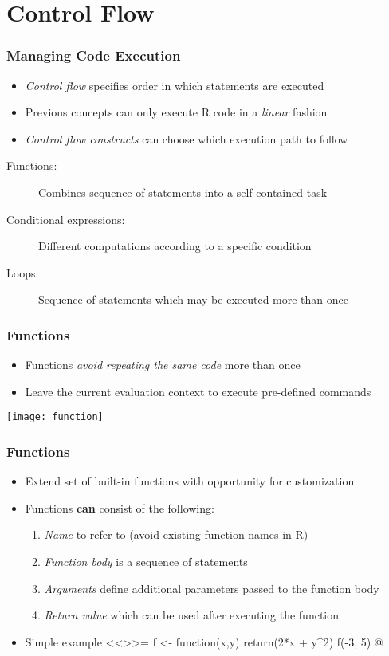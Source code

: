 \documentclass[%
  final,
  11pt, 
  show notes, %
  t, %
  fleqn, %
]{beamer}
\begin{document}
\section{Control Flow}

\begin{frame}
  \frametitle{Managing Code Execution}
\begin{itemize}
\item \emph{Control flow} specifies order in which statements are executed
\item Previous concepts can only execute R code in a \emph{linear} fashion
\item \emph{Control flow constructs} can choose which execution path to follow
\end{itemize}
\vspace{1cm}
\begin{description}
\item[Functions:] Combines sequence of statements into a self-contained task
\item[Conditional expressions:] Different computations according to a specific condition
\item[Loops:] Sequence of statements which may be executed more than once
\end{description}		
\end{frame}

\begin{frame}[fragile]
  \frametitle{Functions}
\begin{itemize}
\item Functions \emph{avoid repeating the same code} more than once 
\item Leave the current evaluation context to execute pre-defined commands
\end{itemize}

\begin{center}
\texttt{[image: function]}
\end{center}
\end{frame}

\begin{frame}[fragile]
  \frametitle{Functions}
\begin{itemize}
\item Extend set of built-in functions with opportunity for customization
\item Functions \textbf{can} consist of the following:
\begin{enumerate}
\item \emph{Name} to refer to (avoid existing function names in R)
\item \emph{Function body} is a sequence of statements
\item \emph{Arguments} define additional parameters passed to the function body
\item \emph{Return value} which can be used after executing the function
\end{enumerate}
\item Simple example
<<>>=
f <- function(x,y) {
  return(2*x + y^2)
}
f(-3, 5)
@
\end{itemize}
\end{frame}
\end{document}

